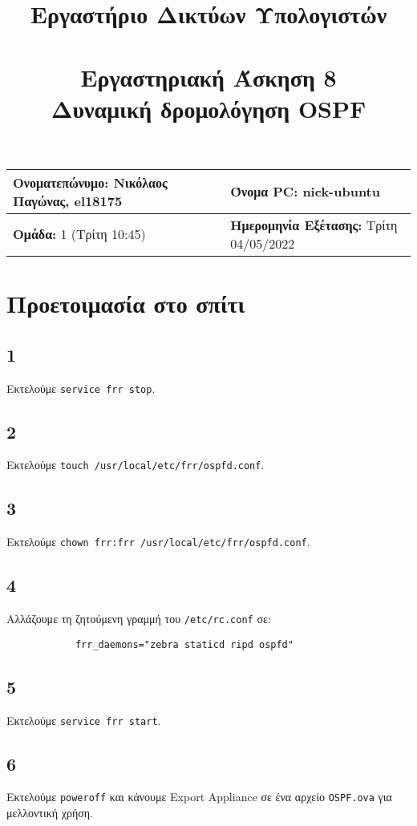 \documentclass[a4paper, 12pt]{article}
\title{
	\textbf{Εργαστήριο Δικτύων Υπολογιστών} \\~\\
	Εργαστηριακή Άσκηση 8 \\ 
	Δυναμική δρομολόγηση OSPF
}
\author{}
\date{}
\begin{document}
\maketitle
\begin{center}
	\begin{tabular}{|l|l|}
		\hline
		\textbf{Ονοματεπώνυμο:} Νικόλαος Παγώνας, el18175  & \textbf{Όνομα PC:} nick-ubuntu \\
		\hline
		\textbf{Ομάδα:} 1 (Τρίτη 10:45) & \textbf{Ημερομηνία Εξέτασης:} Τρίτη 04/05/2022 \\
		\hline
	\end{tabular}
\end{center}

\section*{Προετοιμασία στο σπίτι}
	\subsection*{1}
		Εκτελούμε \verb|service frr stop|.
	
	\subsection*{2}
		Εκτελούμε \verb|touch /usr/local/etc/frr/ospfd.conf|.
		
	\subsection*{3}
		Εκτελούμε \verb|chown frr:frr /usr/local/etc/frr/ospfd.conf|.
		
	\subsection*{4}
		Αλλάζουμε τη ζητούμενη γραμμή του \verb|/etc/rc.conf| σε:
		
		\begin{verbatim}
			frr_daemons="zebra staticd ripd ospfd"
		\end{verbatim}
		
	\subsection*{5}
		Εκτελούμε \verb|service frr start|.
		
	\subsection*{6}
		Εκτελούμε \verb|poweroff| και κάνουμε Export Appliance σε ένα αρχείο \verb|OSPF.ova| για μελλοντική χρήση.
		
\end{document}
